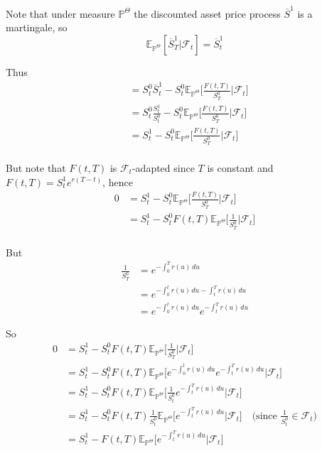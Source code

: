 \documentclass[12pt]{article}
\begin{document}
Note that under measure $\mathbb P^\Theta$ the discounted asset price process $\overline{S}^1$ is a martingale, so
\begin{equation*}
	\mathbb E_{\mathbb P^\Theta}[\overline{S}^1_T | \mathcal F_t] = \overline{S}^1_t
\end{equation*}

Thus
\begin{align*}
	&= S^0_t\overline{S}^1_t - S^0_t\mathbb E_{\mathbb P^\Theta}\bigg[\frac{F(t,T)}{S^0_T} \Big| \mathcal F_t\bigg] \\
	&= S^0_t\frac{S^1_t}{S^0_t} - S^0_t\mathbb E_{\mathbb P^\Theta}\bigg[\frac{F(t,T)}{S^0_T} \Big| \mathcal F_t\bigg] \\
	&= S^1_t - S^0_t\mathbb E_{\mathbb P^\Theta}\bigg[\frac{F(t,T)}{S^0_T} \Big| \mathcal F_t\bigg] \\
\end{align*}

But note that $F(t,T)$ is $\mathcal F_t$-adapted since $T$ is constant and $F(t,T) = S^1_te^{r(T-t)}$, hence
\begin{align*}
	0 &= S^1_t - S^0_t\mathbb E_{\mathbb P^\Theta}\bigg[\frac{F(t,T)}{S^0_T} \Big| \mathcal F_t\bigg] \\
	&= S^1_t - S^0_tF(t,T)\mathbb E_{\mathbb P^\Theta}\bigg[\frac{1}{S^0_T} \Big| \mathcal F_t\bigg] \\
\end{align*}

But 
\begin{align*}
	\frac{1}{S^0_T} &= e^{-\int^T_0 r(u)\,du} \\
	&= e^{-\int^t_0 r(u)\,du - \int^T_t r(u)\,du} \\
	&= e^{-\int^t_0 r(u)\,du}e^{-\int^T_t r(u)\,du}
\end{align*}

So
\begin{align*}
	0 &= S^1_t - S^0_tF(t,T)\mathbb E_{\mathbb P^\Theta}\bigg[\frac{1}{S^0_T} \Big| \mathcal F_t\bigg] \\
	&= S^1_t - S^0_tF(t,T)\mathbb E_{\mathbb P^\Theta}\bigg[e^{-\int^t_0 r(u)\,du}e^{-\int^T_t r(u)\,du} \Big| \mathcal F_t\bigg] \\
	&= S^1_t - S^0_tF(t,T)\mathbb E_{\mathbb P^\Theta}\bigg[\frac{1}{S^0_t}e^{-\int^T_t r(u)\,du} \Big| \mathcal F_t\bigg] \\
	&= S^1_t - S^0_tF(t,T)\frac{1}{S^0_t}\mathbb E_{\mathbb P^\Theta}\bigg[e^{-\int^T_t r(u)\,du} \Big| \mathcal F_t\bigg] \quad \text{(since } \frac{1}{S^0_t}\in\mathcal F_t)\\
	&= S^1_t - F(t,T)\mathbb E_{\mathbb P^\Theta}\bigg[e^{-\int^T_t r(u)\,du} \Big| \mathcal F_t\bigg] \\
\end{align*}
\end{document}
